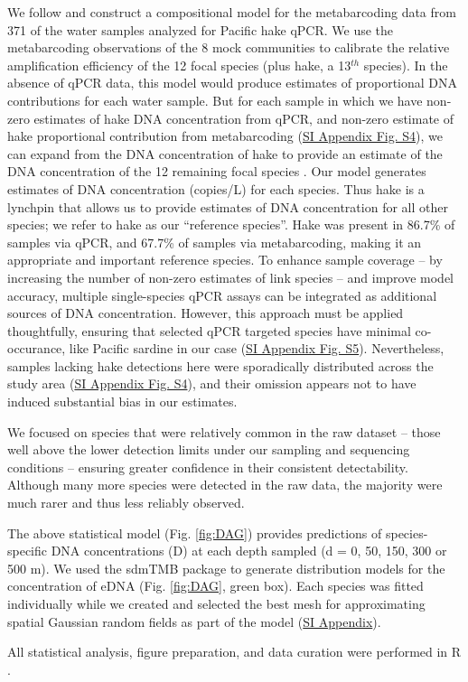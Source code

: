 \documentclass[9pt,twocolumn,twoside]{pnas-new}
\begin{document}
{We follow \cite{shelton2022} and construct a compositional model for the metabarcoding data from 371 of the water samples analyzed for Pacific hake qPCR. We use the metabarcoding observations of the 8 mock communities to calibrate the relative amplification efficiency of the 12 focal species (plus hake, a 13$^{th}$ species). In the absence of qPCR data, this model would produce estimates of proportional DNA contributions for each water sample. But for each sample in which we have non-zero estimates of hake DNA concentration from qPCR, and non-zero estimate of hake proportional contribution from metabarcoding (\href{SI_Appendix.pdf}{SI Appendix Fig. S4}), we can expand from the DNA concentration of hake to provide an estimate of the DNA concentration of the 12 remaining focal species \cite{allan2023}. Our model generates estimates of DNA concentration (copies/L) for each species. Thus hake is a lynchpin that allows us to provide estimates of DNA concentration for all other species; we refer to hake as our “reference species”. Hake was present in 86.7\% of samples via qPCR, and 67.7\% of samples via metabarcoding, making it an appropriate and important reference species. To enhance sample coverage -- by increasing the number of non-zero estimates of link species -- and improve model accuracy, multiple single-species qPCR assays can be integrated as additional sources of DNA concentration. However, this approach must be applied thoughtfully, ensuring that selected qPCR targeted species have minimal co-occurance, like Pacific sardine in our case (\href{SI_Appendix.pdf}{SI Appendix Fig. S5}). Nevertheless, samples lacking hake detections here were sporadically distributed across the study area (\href{SI_Appendix.pdf}{SI Appendix Fig. S4}), and their omission appears not to have induced substantial bias in our estimates. 

We focused on species that were relatively common in the raw dataset – those well above the lower detection limits under our sampling and sequencing conditions – ensuring greater confidence in their consistent detectability. Although many more species were detected in the raw data, the majority were much rarer and thus less reliably observed.

The above statistical model (Fig. \ref{fig:DAG}) provides predictions of species-specific DNA concentrations (D) at each depth sampled (d = 0, 50, 150, 300 or 500 m). We used the sdmTMB package \cite{anderson2022} to generate distribution models for the concentration of eDNA (Fig. \ref{fig:DAG}, green box). Each species was fitted individually while we created and selected the best mesh for approximating spatial Gaussian random fields as part of the model (\href{SI_Appendix.pdf}{SI Appendix}).

All statistical analysis, figure preparation, and data curation were performed in R \cite{rcoreteam2024}.


}
\end{document}

